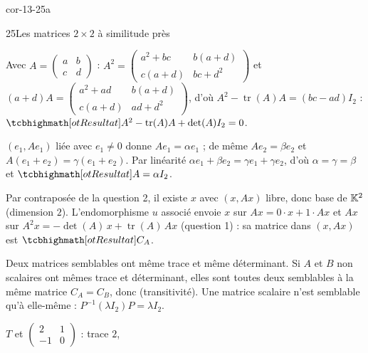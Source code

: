
\begin{blocLivre}{cor-13-25a}
\begin{corrige}{25}{Les matrices $2\times2$ à similitude près}
\begin{questions}
  \item Avec $A=\begin{pmatrix}a&b\\c&d\end{pmatrix}$ :
    $A^{2}=\begin{pmatrix}a^{2}+bc&b(a+d)\\c(a+d)&bc+d^{2}\end{pmatrix}$ et
    $(a+d)A=\begin{pmatrix}a^{2}+ad&b(a+d)\\c(a+d)&ad+d^{2}\end{pmatrix}$,
    d'où $A^{2}-\operatorname{tr}(A)A=(bc-ad)I_2$ :
    $\res{A^{2}-\operatorname{tr}(A)A+\det(A)I_2=0}$.
  \item $(e_1,Ae_1)$ liée avec $e_1\neq0$ donne $Ae_1=\alpha e_1$ ; de même
    $Ae_2=\beta e_2$ et $A(e_1+e_2)=\gamma(e_1+e_2)$. Par linéarité
    $\alpha e_1+\beta e_2=\gamma e_1+\gamma e_2$, d'où
    $\alpha=\gamma=\beta$ et $\res{A=\alpha I_2}$.
  \item Par contraposée de la question 2, il existe $x$ avec $(x,Ax)$
    libre, donc base de $\mathbb{K}^{2}$ (dimension $2$). L'endomorphisme $u$
    associé envoie $x$ sur $Ax=0\cdot x+1\cdot Ax$ et $Ax$ sur
    $A^{2}x=-\det(A)\,x+\operatorname{tr}(A)\,Ax$ (question 1) : sa matrice
    dans $(x,Ax)$ est $\res{C_A}$.
\end{questions}
\begin{questions}[resume]
  \item Deux matrices semblables ont même trace et même déterminant. Si
    $A$ et $B$ non scalaires ont mêmes trace et déterminant, elles sont
    toutes deux semblables à la même matrice $C_A=C_B$, donc
     (transitivité). Une matrice scalaire
    n'est semblable qu'à elle-même : $P^{-1}(\lambda I_2)P=\lambda I_2$.
  \item $T$ et $\begin{pmatrix}2&1\\-1&0\end{pmatrix}$ : trace $2$,

\end{questions}
\end{corrige}
\end{blocLivre}
